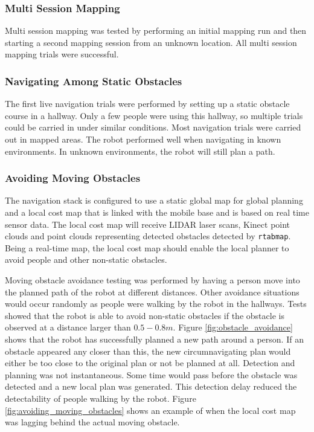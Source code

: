 \subsubsection{Multi Session Mapping}

Multi session mapping was tested by performing an initial mapping run and then starting a second mapping session from an unknown location. All multi session mapping trials were successful. 

\subsubsection{Navigating Among Static Obstacles}

The first live navigation trials were performed by setting up a static obstacle course in a hallway. Only a few people were using this hallway, so multiple trials could be carried in under similar conditions. Most navigation trials were carried out in mapped areas. The robot performed well when navigating in known environments. In unknown environments, the robot will still plan a path. 



\subsubsection{Avoiding Moving Obstacles}

The navigation stack is configured to use a static global map for global planning and a local cost map that is linked with the mobile base and is based on real time sensor data. The local cost map will receive LIDAR laser scans, Kinect point clouds and point clouds representing detected obstacles detected by \texttt{rtabmap}. Being a real-time map, the local cost map should enable the local planner to avoid people and other non-static obstacles.

Moving obstacle avoidance testing was performed by having a person move into the planned path of the robot at different distances. Other avoidance situations would occur randomly as people were walking by the robot in the hallways. Tests showed that the robot is able to avoid non-static obstacles if the obstacle is observed at a distance larger than $0.5 - 0.8 m$. Figure \ref{fig:obstacle_avoidance} shows that the robot has successfully planned a new path around a person. If an obstacle appeared any closer than this, the new circumnavigating plan would either be too close to the original plan or not be planned at all. Detection and planning was not instantaneous. Some time would pass before the obstacle was detected and a new local plan was generated. This detection delay reduced the detectability of people walking by the robot. Figure \ref{fig:avoiding_moving_obstacles} shows an example of when the local cost map was lagging behind the actual moving obstacle.



